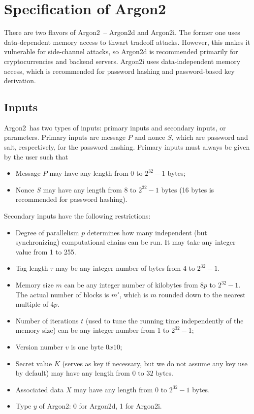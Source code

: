 \documentclass[a4paper]{article}
\begin{document}
\section{Specification of Argon2}

There are two flavors of \textsf{Argon2}\ -- \textsf{Argon2d} and \textsf{Argon2i}. The former one uses data-dependent memory access to thwart tradeoff attacks. However, this makes it vulnerable for side-channel attacks, so \textsf{Argon2d} is recommended primarily for cryptocurrencies and backend servers. \textsf{Argon2i} uses data-independent memory access, which is recommended for password hashing and password-based key derivation.

\subsection{Inputs}

\textsf{Argon2}\ has two types of inputs: primary inputs and secondary inputs, or parameters. Primary inputs are message $P$ and nonce $S$, which are password and salt, respectively, for the password hashing. Primary inputs must always be given by the user such that
\begin{itemize}
  \item Message $P$ may have any length from $0$ to $2^{32}-1$ bytes;
  \item Nonce $S$ may have any length from $8$ to $2^{32}-1$ bytes (16 bytes is recommended for password hashing).
\end{itemize}
 Secondary inputs have the following restrictions:
\begin{itemize}
  \item Degree of parallelism $p$ determines how many independent (but synchronizing) computational chains can be run.  It may take any integer value from 1 to 255.
  \item Tag length $\tau$ may be any integer number of bytes from 4 to $2^{32}-1$.
  \item Memory size $m$ can be any integer number of kilobytes from $8p$ to $2^{32}-1$. The actual number of blocks is $m'$, which is $m$ rounded down to the nearest multiple of $4p$. 
  \item Number of iterations $t$ (used to tune the running time independently of the memory size) can be any integer number from 1 to $2^{32}-1$;
  \item Version number $v$ is one byte $0x10$;
  \item Secret value $K$ (serves as key if necessary, but we do not assume any key use by default) may have any length from $0$ to $32$ bytes.
  \item Associated data $X$ may have any length from $0$ to $2^{32}-1$ bytes.
  \item Type $y$ of \textsf{Argon2}: 0 for  \textsf{Argon2d}, 1 for \textsf{Argon2i}.
\end{itemize}
\end{document}
